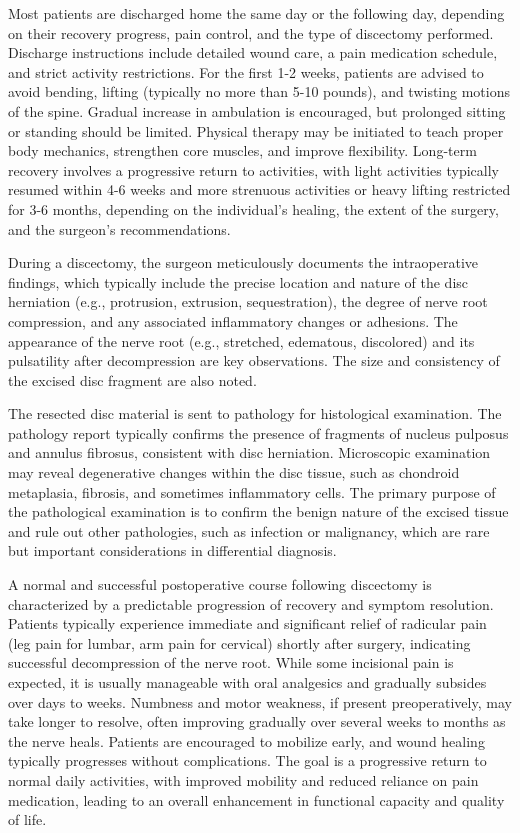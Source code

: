 Most patients are discharged home the same day or the following day, depending on their recovery progress, pain control, and the type of discectomy performed. Discharge instructions include detailed wound care, a pain medication schedule, and strict activity restrictions. For the first 1-2 weeks, patients are advised to avoid bending, lifting (typically no more than 5-10 pounds), and twisting motions of the spine. Gradual increase in ambulation is encouraged, but prolonged sitting or standing should be limited. Physical therapy may be initiated to teach proper body mechanics, strengthen core muscles, and improve flexibility. Long-term recovery involves a progressive return to activities, with light activities typically resumed within 4-6 weeks and more strenuous activities or heavy lifting restricted for 3-6 months, depending on the individual's healing, the extent of the surgery, and the surgeon's recommendations.

During a discectomy, the surgeon meticulously documents the intraoperative findings, which typically include the precise location and nature of the disc herniation (e.g., protrusion, extrusion, sequestration), the degree of nerve root compression, and any associated inflammatory changes or adhesions. The appearance of the nerve root (e.g., stretched, edematous, discolored) and its pulsatility after decompression are key observations. The size and consistency of the excised disc fragment are also noted.

The resected disc material is sent to pathology for histological examination. The pathology report typically confirms the presence of fragments of nucleus pulposus and annulus fibrosus, consistent with disc herniation. Microscopic examination may reveal degenerative changes within the disc tissue, such as chondroid metaplasia, fibrosis, and sometimes inflammatory cells. The primary purpose of the pathological examination is to confirm the benign nature of the excised tissue and rule out other pathologies, such as infection or malignancy, which are rare but important considerations in differential diagnosis.

A normal and successful postoperative course following discectomy is characterized by a predictable progression of recovery and symptom resolution. Patients typically experience immediate and significant relief of radicular pain (leg pain for lumbar, arm pain for cervical) shortly after surgery, indicating successful decompression of the nerve root. While some incisional pain is expected, it is usually manageable with oral analgesics and gradually subsides over days to weeks. Numbness and motor weakness, if present preoperatively, may take longer to resolve, often improving gradually over several weeks to months as the nerve heals. Patients are encouraged to mobilize early, and wound healing typically progresses without complications. The goal is a progressive return to normal daily activities, with improved mobility and reduced reliance on pain medication, leading to an overall enhancement in functional capacity and quality of life.

